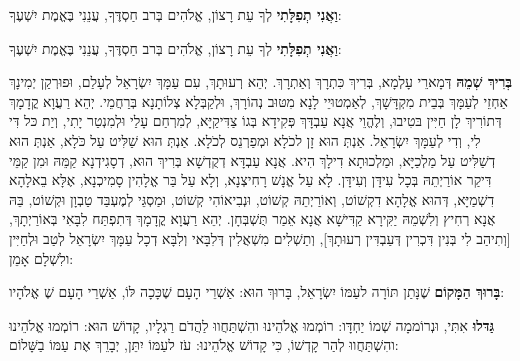

\textbf{וַאֲנִי תְפִלָּתִי} לְךָ \Shem{} עֵת רָצוֹן, אֱלֹהִים בְּרב חַסְדֶּךָ, עֲנֵנִי בֶּאֱמֶת יִשְׁעֶךָ:

\textbf{וַאֲנִי תְפִלָּתִי} לְךָ \Shem{} עֵת רָצוֹן, אֱלֹהִים בְּרב חַסְדֶּךָ, עֲנֵנִי בֶּאֱמֶת יִשְׁעֶךָ:

\textbf{בְּרִיךְ שְׁמֵהּ} דְּמָארֵי עָלְמָא, בְּרִיךְ כִּתְרָךְ וְאַתְרָךְ. יְהֵא רְעוּתָךְ, עִם עַמָּךְ יִשְׂרָאֵל לְעָלַם, וּפוּרְקַן יְמִינָךְ אַחְזֵי לְעַמָּךְ בְּבֵית מִקְדָּשָׁךְ, לְאַמְטוּיֵי לָנָא מִטּוּב נְהוֹרָךְ, וּלְקַבְּלָא צְלוֹתָנָא בְּרַחֲמֵי. יְהֵא רַעֲוָא קֳדָמָךְ דְּתוֹרִיךְ לָן חַיִּין בּטִיבוּ, וְלֶהֱוֵי אֲנָא עַבְדָּךְ פְּקִידָא בְּגוֹ צַדִּיקַיָּא, לְמִרְחַם עָלַי וּלְמִנְטַר יָתִי, וְיַת כּל דִּי לִי, וְדִי לְעַמָּךְ יִשְׂרָאֵל. אַנְתְּ הוּא זָן לכֹלָא וּמְפַרְנֵס לְכֹלָא. אַנְתְּ הוּא שַׁלִּיט עַל כֹּלָא, אַנְתְּ הוּא דְשַׁלִּיט עַל מַלְכַיָּא, וּמַלְכוּתָא דִילָךְ הִיא. אֲנָא עַבְדָּא דְקֻדְשָׁא בְּרִיךְ הוּא, דְסָגִידְנָא קַמֵּהּ וּמִן קַמֵּי דִּיקַר אוֹרַיְתֵהּ בְּכָל עִידָּן וְעִידָּן. לָא עַל אֱנָשׁ רָחִיצְנָא, וְלָא עַל בַּר אֱלָהִין סָמִיכְנָא, אֶלָּא בֵאלָהָא דִשְׁמַיָּא, דְּהוּא אֱלָהָא דִקְשׁוֹט, וְאוֹרַיְתֵהּ קְשׁוֹט, וּנְבִיאוֹהִי קְשׁוֹט, וּמַסְגֵּי לְמֶעְבַּד טַבְוָן וּקְשׁוֹט, בֵּהּ אֲנָא רְחִיץ וְלִשְׁמֵהּ יַקִּירָא קַדִּישָׁא אֲנָא אֵמַר תֻּשְׁבְּחָן. יְהֵא רַעֲוָא קֳדָמָךְ דְּתִפְתַּח לִבָּאִי בְּאוֹרַיְתָךְ, [וְתִיהַב לִי בְּנִין דִּכְרִין דְּעַבְדִּין רְעוּתָךְ], וְתַשְׁלִים מִשְׁאֲלִין דְּלִבָּאי וְלִבָּא דְכָל עַמָּךְ יִשְׂרָאֵל לְטַב וּלְחַיִּין ולִשְׁלָם אָמֵן:

\textbf{בָּרוּךְ הַמָּקוֹם} שֶׁנָּתַן תּוֹרָה לעַמּוֹ יִשְׂרָאֵל, בָּרוּךְ הוּא: אַשְׁרֵי הָעָם שֶׁכָּכָה לּוֹ, אַשְׁרֵי הָעָם שֶׁ\Shem{} אֱלֹהָיו:

\textbf{גַּדּלוּ}  אִתִּי, וּנְרוֹממָה שְׁמוֹ יַחְדָּו: רוֹמְמוּ \Shem{} אֱלֹהֵינוּ והִשְׁתַּחֲווּ לַהֲדֹם רַגְלָיו, קָדוֹשׁ הוּא: רוֹמְמוּ \Shem{} אֱלֹהֵינוּ והִשְׁתַּחֲווּ לְהַר קָדְשׁוֹ, כִּי קָדוֹשׁ \Shem{} אֱלֹהֵינוּ: \Shem{} עֹז לעַמּוֹ יִתֵּן, \Shem{} יְבָרֵךְ אֶת עַמּוֹ בַשָּׁלוֹם:

